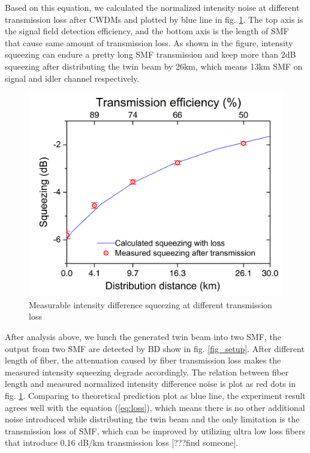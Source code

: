 \documentclass[9pt,twocolumn,twoside]{osajnl}
\begin{document}
Based on this equation, we calculated the normalized intensity noise at different transmission loss after CWDMs and plotted by blue line in fig. \ref{fig_loss}. The top axis is the signal field detection efficiency, and the bottom axis is the length of SMF that cause same amount of transmission loss. As shown in the figure, intensity squeezing can endure a pretty long SMF transmission and keep more than 2dB squeezing after distributing the twin beam by 26km, which means 13km SMF on signal and idler channel respectively.

\begin{figure}[htbp]
\centering
\includegraphics[width=\linewidth]{Sqz_vs_Length_dB_color.jpg}
\caption{Measurable intensity difference squeezing at different transmission loss}
\label{fig_loss}
\end{figure}

After analysis above, we lunch the generated twin beam into two SMF, the output from two SMF are detected by BD show in fig. \ref{fig_setup}.
After different length of fiber, the attenuation caused by fiber transmission loss makes the measured intensity squeezing degrade accordingly.
The relation between fiber length and measured normalized intensity difference noise is plot as red dots in fig. \ref{fig_loss}.
Comparing to theoretical prediction plot as blue line, the experiment result agrees well with the equation (\ref{eq:loss}), which means there is no other additional noise introduced while distributing the twin beam and the only limitation is the transmission loss of SMF, which can be improved by utilizing ultra low loss fibers that introduce 0.16 dB/km transmission loss [???find someone].
\end{document}
